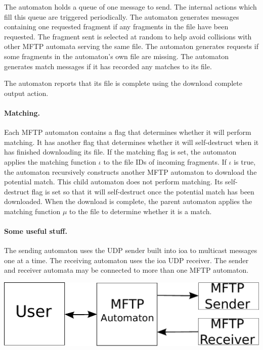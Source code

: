 \documentclass[letterpaper]{article}
\begin{document}
The automaton holds a queue of one message to send. 
The internal actions which fill this queue are triggered periodically.
The automaton generates messages containing one requested fragment if any fragments in the file have been requested.
The fragment sent is selected at random to help avoid collisions with other MFTP automata serving the same file.
The automaton generates requests if some fragments in the automaton's own file are missing.
The automaton generates match messages if it has recorded any matches to its file.

The automaton reports that its file is complete using the download complete output action.

\paragraph{Matching.}
Each MFTP automaton contains a flag that determines whether it will perform matching. 
It has another flag that determines whether it will self-destruct when it has finished downloading its file.
If the matching flag is set, the automaton applies the matching function $\iota$ to the file IDs of incoming fragments.
If $\iota$ is true, the automaton recursively constructs another MFTP automaton to download the potential match.
This child automaton does not perform matching.  
Its self-destruct flag is set so that it will self-destruct once the potential match has been downloaded.
When the download is complete, the parent automaton applies the matching function $\mu$ to the file to determine whether it is a match.

\paragraph{Some useful stuff.} %
The sending automaton uses the UDP sender built into ioa to multicast messages one at a time.
The receiving automaton uses the ioa UDP receiver.
The sender and receiver automata may be connected to more than one MFTP automaton.

\vspace{5mm}
\includegraphics[scale=0.65]{diagramOne}
\end{document}
